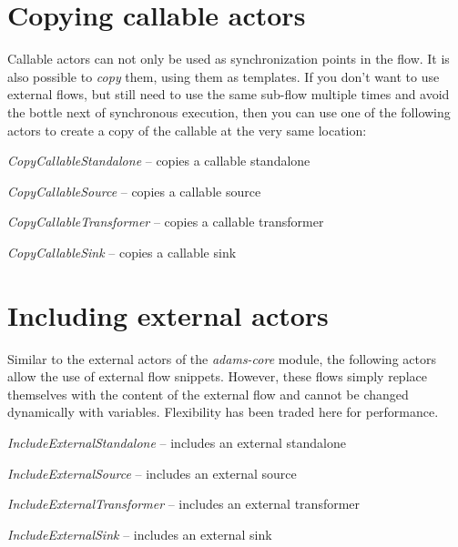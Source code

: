 \documentclass[a4paper]{book}
\begin{document}
\newpage
\chapter{Copying callable actors}
\label{copycallableactors}
Callable actors can not only be used as synchronization points in the flow. It
is also possible to \textit{copy} them, using them as templates. If you don't
want to use external flows, but still need to use the same sub-flow multiple
times and avoid the bottle next of synchronous execution, then you can use
one of the following actors to create a copy of the callable at the very same 
location:
\begin{tight_itemize}
	\item \textit{CopyCallableStandalone} -- copies a callable standalone
	\item \textit{CopyCallableSource} -- copies a callable source
	\item \textit{CopyCallableTransformer} -- copies a callable transformer
	\item \textit{CopyCallableSink} -- copies a callable sink
\end{tight_itemize}

\newpage
\chapter{Including external actors}
\label{includeexteranlactors}
Similar to the external actors of the \textit{adams-core} module, the following
actors allow the use of external flow snippets. However, these flows simply
replace themselves with the content of the external flow and cannot be changed
dynamically with variables. Flexibility has been traded here for performance.
\begin{tight_itemize}
	\item \textit{IncludeExternalStandalone} -- includes an external standalone
	\item \textit{IncludeExternalSource} -- includes an external source
	\item \textit{IncludeExternalTransformer} -- includes an external transformer
	\item \textit{IncludeExternalSink} -- includes an external sink
\end{tight_itemize}

\newpage
\end{document}
